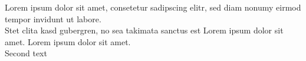 \documentclass[11pt]{article}
\begin{document}
Lorem ipsum dolor sit amet, consetetur sadipscing elitr, sed diam nonumy eirmod tempor invidunt ut labore.\\Stet clita kasd gubergren, no sea takimata sanctus est Lorem ipsum dolor sit amet. Lorem ipsum dolor sit amet.\\

Second text\\
\end{document}

